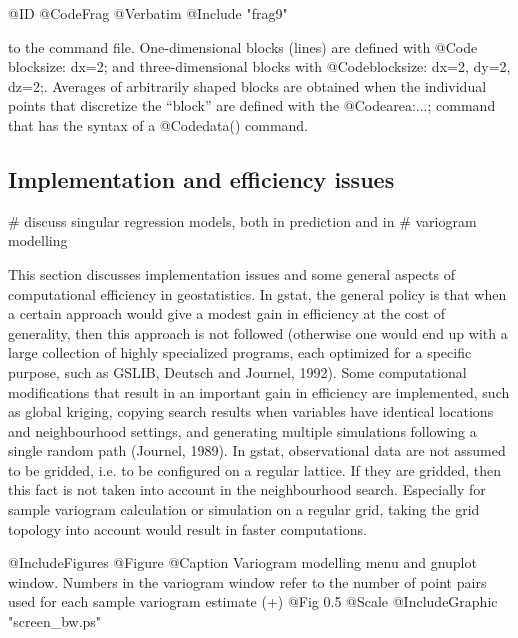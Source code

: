 \documentclass{article}
\begin{document}
@ID @CodeFrag { @Verbatim { @Include { "frag9" }}}

to the command file. One-dimensional blocks (lines) are defined
with @Code{ blocksize: dx=2;} and three-dimensional blocks with
@Code{blocksize: dx=2, dy=2, dz=2;}. Averages of arbitrarily shaped
blocks are obtained when the individual points that discretize the
``block'' are defined with the @Code{area:...;} command that has the
syntax of a @Code{data()} command.

\subsection{ Implementation and efficiency issues }
\label{ implementation }

# discuss singular regression models, both in prediction and in
# variogram modelling

This section discusses implementation issues and some general aspects of
computational efficiency in geostatistics. In gstat, the general policy
is that when a certain approach would give a modest gain in efficiency
at the cost of generality, then this approach is not followed (otherwise
one would end up with a large collection of highly specialized programs,
each optimized for a specific purpose, such as GSLIB, Deutsch and Journel,
1992). Some computational modifications that result in an important
gain in efficiency are implemented, such as global kriging, copying
search results when variables have identical locations and neighbourhood
settings, and generating multiple simulations following a single random
path (Journel, 1989). In gstat, observational data are not assumed to be
gridded, i.e. to be configured on a regular lattice. If they are
gridded, then this fact is not taken into account in the neighbourhood
search. Especially for sample variogram calculation or simulation on a
regular grid, taking the grid topology into account would result in
faster computations.

@IncludeFigures {
@Figure
 @Caption { Variogram modelling menu and gnuplot window. Numbers in the
variogram window refer to the number of point pairs used for each sample
variogram estimate (+) }
{ @Fig { 0.5 @Scale @IncludeGraphic { "screen_bw.ps" }} }
}
\end{document}
